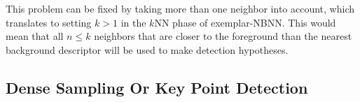 This problem can be fixed by taking more than one neighbor into account, which translates to setting $k>1$ in the $k$NN phase of exemplar-NBNN. This would mean that all $n\leq k$ neighbors that are closer to the foreground than the nearest background descriptor will be used to make detection hypotheses.


\subsection{Dense Sampling Or Key Point Detection} %
\label{sec:dense_sampling_or_key_point_detection}


